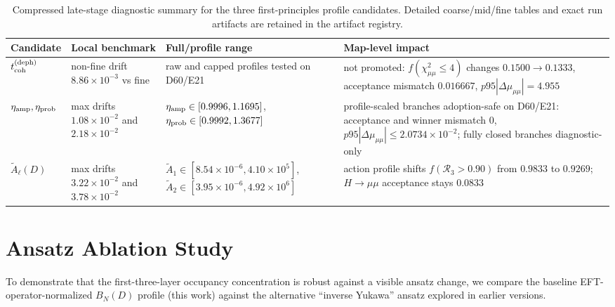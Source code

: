 \documentclass[aps,prd,onecolumn,notitlepage,nofootinbib,superscriptaddress,11pt,floatfix]{revtex4-2}
\begin{document}
\begin{table}[ht]
\centering
\caption{Compressed late-stage diagnostic summary for the three first-principles profile candidates. Detailed coarse/mid/fine tables and exact run artifacts are retained in the artifact registry.}
\label{tab:late_fp_profile_summary}
\small
\setlength{\tabcolsep}{4pt}
\begin{tabular}{@{}l l l l@{}}
\hline\hline
Candidate & Local benchmark & Full/profile range & Map-level impact \\
\hline
\parbox[t]{0.16\textwidth}{$t_{\rm coh}^{\rm(deph)}$} & \parbox[t]{0.22\textwidth}{non-fine drift $8.86\times10^{-3}$ vs fine} & \parbox[t]{0.23\textwidth}{raw and capped profiles tested on D60/E21} & \parbox[t]{0.25\textwidth}{not promoted: $f(\chi^2_{\mu\mu}\le4)$ changes $0.1500\to0.1333$, acceptance mismatch $0.016667$, $p95|\Delta\mu_{\mu\mu}|=4.955$} \\
\parbox[t]{0.16\textwidth}{$\eta_{\rm amp},\eta_{\rm prob}$} & \parbox[t]{0.22\textwidth}{max drifts $1.08\times10^{-2}$ and $2.18\times10^{-2}$} & \parbox[t]{0.23\textwidth}{$\eta_{\rm amp}\in[0.9996,1.1695]$, $\eta_{\rm prob}\in[0.9992,1.3677]$} & \parbox[t]{0.25\textwidth}{profile-scaled branches adoption-safe on D60/E21: acceptance and winner mismatch $0$, $p95|\Delta\mu_{\mu\mu}|\le2.0734\times10^{-2}$; fully closed branches diagnostic-only} \\
\parbox[t]{0.16\textwidth}{$\tilde A_\ell(D)$} & \parbox[t]{0.22\textwidth}{max drifts $3.22\times10^{-2}$ and $3.78\times10^{-2}$} & \parbox[t]{0.23\textwidth}{$\tilde A_1\in[8.54\times10^{-6},4.10\times10^5]$, $\tilde A_2\in[3.95\times10^{-6},4.92\times10^6]$} & \parbox[t]{0.25\textwidth}{action profile shifts $f(\mathcal R_3>0.90)$ from $0.9833$ to $0.9269$; $H\to\mu\mu$ acceptance stays $0.0833$} \\
\hline\hline
\end{tabular}
\end{table}

\clearpage


\section{Ansatz Ablation Study}
\label{app:ablation}

To demonstrate that the first-three-layer occupancy concentration is robust against a visible ansatz change, we compare the baseline EFT-operator-normalized $B_N(D)$ profile (this work) against the alternative ``inverse Yukawa'' ansatz explored in earlier versions.
\end{document}
